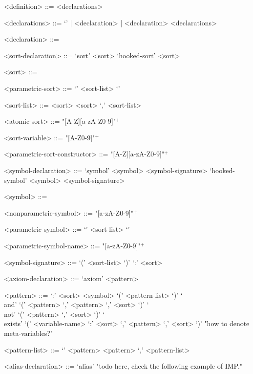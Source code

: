 \documentclass[UTF8,11pt]{article}
\theoremstyle{plain}
\theoremstyle{definition}
\theoremstyle{remark}
\begin{document}
\begin{grammar}\small
	<definition>    ::= <declarations>
	
	<declarations> ::= `' | <declaration> | <declaration> <declarations>
	
	<declaration>   ::= \quad
	\alt <sort-declaration> 
	\alt <symbol-declaration> 
	\alt <axiom-declaration>
	\alt <alias-declaration>
	
	<sort-declaration> ::= \quad
	\alt `sort' <sort>
	\alt `hooked-sort' <sort> 
	
	<sort> ::= \quad
	\alt <atomic-sort> 
	\alt <parametric-sort>
	
	<parametric-sort> ::= \quad
	\alt <parametric-sort-constructor> `{' <sort-list> `}'
	
	<sort-list> ::= \quad 
	\alt <sort> 
	\alt <sort> `,' <sort-list>
	
	<atomic-sort> ::= "[A-Z][a-zA-Z0-9]"$^+$
	
	<sort-variable> ::= "[A-Z0-9]"$^+$
	
	<parametric-sort-constructor> ::= "[A-Z][a-zA-Z0-9]"$^+$
	
	<symbol-declaration> ::= \quad
	\alt `symbol' <symbol> <symbol-signature>
	\alt `hooked-symbol' <symbol> <symbol-signature>
	
	<symbol> ::= \quad
	\alt <nonparametric-symbol>
	\alt <parametric-symbol>
	
	<nonparametric-symbol> ::= "[a-zA-Z0-9]"$^+$
	
	<parametric-symbol> ::= \quad
	\alt <parametric-symbol-name> `{' <sort-list> `}'
	
	<parametric-symbol-name> ::= "[a-zA-Z0-9]"$^+$
	
	<symbol-signature> ::= \quad
	\alt `(' <sort-list> `)' `:' <sort>
	
	<axiom-declaration> ::= \quad
	\alt `axiom' <pattern>
	
	<pattern> ::= \quad
	\alt <variable-name> `:' <sort>
	\alt <symbol> `(' <pattern-list> `)'
	\alt `\\and' `(' <pattern> `,' <pattern> `,' <sort> `)'
	\alt `\\not' `(' <pattern> `,' <sort> `)' 
	\alt `\\exists' `(' <variable-name> `:' <sort> `,' <pattern> `,' <sort> `)'
	\alt "how to denote meta-variables?"
	
	<pattern-list> ::= \quad
	\alt `' 
	\alt <pattern> 
	\alt <pattern> `,' <pattern-list>
	
	<alias-declaration> ::= \quad
	\alt `alias' "todo here, check the following example of IMP."
\end{grammar}
\end{document}
